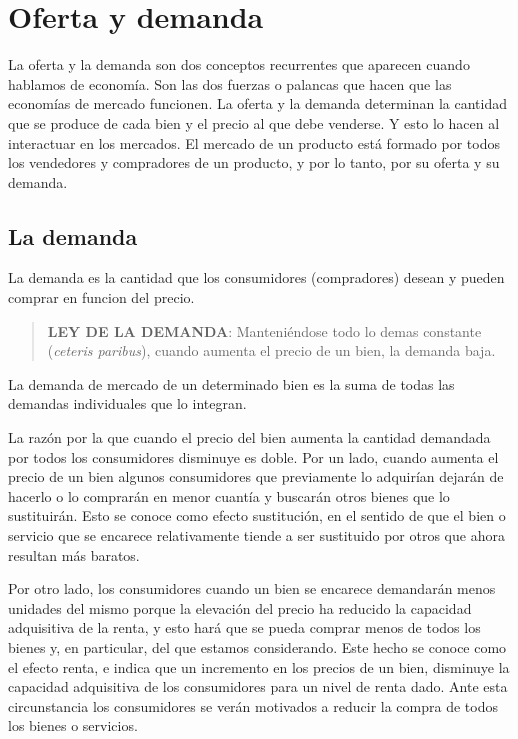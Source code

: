 \documentclass[
]{book}
\begin{document}
\hypertarget{oferta-y-demanda}{%
\chapter{Oferta y demanda}\label{oferta-y-demanda}}

La oferta y la demanda son dos conceptos recurrentes que aparecen cuando hablamos de economía. Son las dos fuerzas o palancas que hacen que las economías de mercado funcionen. La oferta y la demanda determinan la cantidad que se produce de cada bien y el precio al que debe venderse. Y esto lo hacen al interactuar en los mercados. El mercado de un producto está formado por todos los vendedores y compradores de un producto, y por lo tanto, por su oferta y su demanda.

\hypertarget{la-demanda}{%
\section{La demanda}\label{la-demanda}}

La demanda es la cantidad que los consumidores (compradores) desean y pueden comprar en funcion del precio.

\begin{quote}
\textbf{LEY DE LA DEMANDA}:
Manteniéndose todo lo demas constante (\emph{ceteris paribus}), cuando aumenta el precio de un bien, la demanda baja.
\end{quote}

La demanda de mercado de un determinado bien es la suma de todas las demandas individuales que lo integran.

La razón por la que cuando el precio del bien aumenta la cantidad demandada por todos los consumidores disminuye es doble. Por un lado, cuando aumenta el precio de un bien algunos consumidores que previamente lo adquirían dejarán de hacerlo o lo comprarán en menor cuantía y buscarán otros bienes que lo sustituirán. Esto se conoce como efecto sustitución, en el sentido de que el bien o servicio que se encarece relativamente tiende a ser sustituido por otros que ahora resultan más baratos.

Por otro lado, los consumidores cuando un bien se encarece demandarán menos unidades del mismo porque la elevación del precio ha reducido la capacidad adquisitiva de la renta, y esto hará que se pueda comprar menos de todos los bienes y, en particular, del que estamos considerando. Este hecho se conoce como el efecto renta, e indica que un incremento en los precios de un bien, disminuye la capacidad adquisitiva de los consumidores para un nivel de renta dado. Ante esta circunstancia los consumidores se verán motivados a reducir la compra de todos los bienes o servicios.
\end{document}
